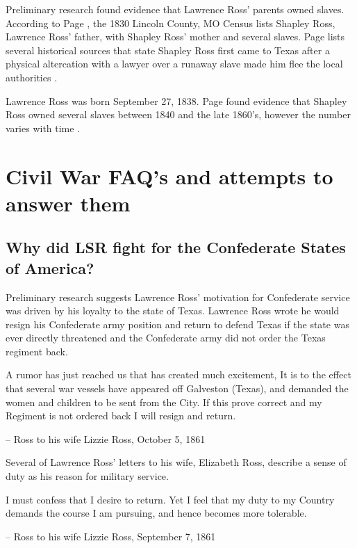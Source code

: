 \documentclass[12pt]{article}
\begin{document}
Preliminary research found evidence that Lawrence Ross' parents owned slaves. According to Page \cite[pg.49]{page}, the 1830 Lincoln County, MO Census lists Shapley Ross, Lawrence Ross' father, with Shapley Ross' mother and several slaves. Page lists several historical sources that state Shapley Ross first came to Texas after a physical altercation with a lawyer over a runaway slave made him flee the local authorities \cite[pg.50--51]{page}. 

Lawrence Ross was born September 27, 1838. Page found evidence that Shapley Ross owned several slaves between 1840 and the late 1860's, however the number varies with time \cite[pg.51--55]{page}. 

\newpage
\section{Civil War FAQ's and attempts to answer them}

\subsection{Why did LSR fight for the Confederate States of America?}
Preliminary research suggests Lawrence Ross' motivation for Confederate service was driven by his loyalty to the state of Texas. Lawrence Ross wrote he would resign his Confederate army position and return to defend Texas if the state was ever directly threatened and the Confederate army did not order the Texas regiment back. 
\begin{displayquote}
A rumor has just reached us that has created much excitement, It is to the effect that several war vessels have appeared off Galveston (Texas), and demanded the women and children to be sent from the City. If this prove correct and my Regiment is not ordered back I will resign and return. 

-- Ross to his wife Lizzie Ross, October 5, 1861 \cite[pg. 9]{sullyletters}
\end{displayquote}

Several of Lawrence Ross' letters to his wife, Elizabeth Ross, describe a sense of duty as his reason for military service.
\begin{displayquote}
I must confess that I desire to return. Yet I feel that my duty to my Country demands the course I am pursuing, and hence becomes more tolerable. 

-- Ross to his wife Lizzie Ross, September 7, 1861 \cite[pg. 3]{sullyletters}
\end{displayquote}
\end{document}
